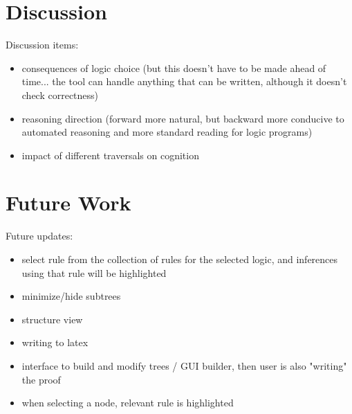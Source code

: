 \documentclass[conference]{IEEEtran}
\begin{document}

\section{Discussion}
\label{sec:discussion}


Discussion items:

\begin{itemize}
    \item consequences of logic choice (but this doesn't have to be made ahead of time... the tool can handle anything that can be written, although it doesn't check correctness)
    \item reasoning direction (forward more natural, but backward more conducive to automated reasoning and more standard reading for logic programs)
    \item impact of different traversals on cognition
\end{itemize}

\section{Future Work}
\label{sec:future}

Future updates:

\begin{itemize}
    \item select rule from the collection of rules for the selected logic, and inferences using that rule will be highlighted
    \item minimize/hide subtrees
    \item structure view
    \item writing to latex
    \item interface to build and modify trees / GUI builder, then user is also "writing" the proof
    \item when selecting a node, relevant rule is highlighted
\end{itemize}
\end{document}
